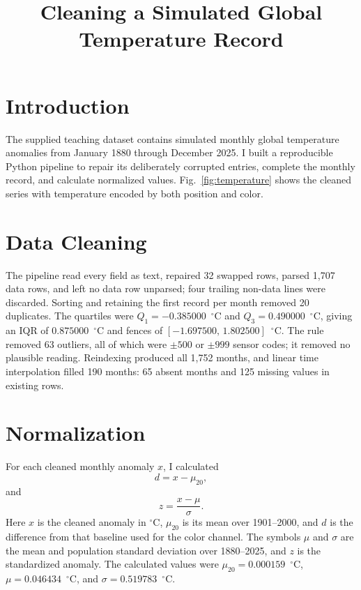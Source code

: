 \documentclass[conference]{IEEEtran}
\title{Cleaning a Simulated Global Temperature Record}
\author{\IEEEauthorblockN{Siva Srinivas Venigalla}
\IEEEauthorblockA{sv2881@nyu.edu}}
\begin{document}
\maketitle

\section{Introduction}
The supplied teaching dataset contains simulated monthly global temperature
anomalies from January 1880 through December 2025. I built a reproducible
Python pipeline to repair its deliberately corrupted entries, complete the
monthly record, and calculate normalized values. Fig.~\ref{fig:temperature}
shows the cleaned series with temperature encoded by both position and color.

\section{Data Cleaning}
The pipeline read every field as text, repaired 32 swapped rows, parsed 1,707
data rows, and left no data row unparsed; four trailing non-data lines were
discarded. Sorting and retaining the first record per month removed 20
duplicates. The quartiles were $Q_1=-0.385000$~$^\circ$C and
$Q_3=0.490000$~$^\circ$C, giving an IQR of $0.875000$~$^\circ$C and fences
of $[-1.697500,\,1.802500]$~$^\circ$C. The rule removed 63 outliers, all of
which were $\pm500$ or $\pm999$ sensor codes; it removed no plausible
reading. Reindexing produced all 1,752 months, and linear time interpolation
filled 190 months: 65 absent months and 125 missing values in existing rows.

\section{Normalization}
For each cleaned monthly anomaly $x$, I calculated
\begin{equation}
    d = x - \mu_{20},
    \label{eq:difference}
\end{equation}
and
\begin{equation}
    z = \frac{x - \mu}{\sigma}.
    \label{eq:zscore}
\end{equation}
Here $x$ is the cleaned anomaly in $^\circ$C, $\mu_{20}$ is its mean over
1901--2000, and $d$ is the difference from that baseline used for the color
channel. The symbols $\mu$ and $\sigma$ are the mean and population standard
deviation over 1880--2025, and $z$ is the standardized anomaly. The calculated
values were $\mu_{20}=0.000159$~$^\circ$C, $\mu=0.046434$~$^\circ$C, and
$\sigma=0.519783$~$^\circ$C.
\end{document}
